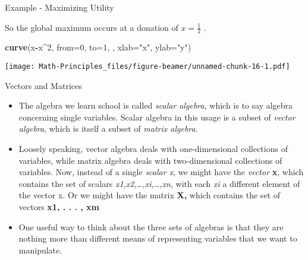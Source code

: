 \documentclass[
  ignorenonframetext,
]{beamer}
\newenvironment{Shaded}{\begin{snugshade}}{\end{snugshade}}
\newcommand{\DataTypeTok}[1]{\textcolor[rgb]{0.13,0.29,0.53}{#1}}
\newcommand{\DecValTok}[1]{\textcolor[rgb]{0.00,0.00,0.81}{#1}}
\newcommand{\KeywordTok}[1]{\textcolor[rgb]{0.13,0.29,0.53}{\textbf{#1}}}
\newcommand{\NormalTok}[1]{#1}
\newcommand{\OperatorTok}[1]{\textcolor[rgb]{0.81,0.36,0.00}{\textbf{#1}}}
\newcommand{\StringTok}[1]{\textcolor[rgb]{0.31,0.60,0.02}{#1}}
\begin{document}
\begin{frame}[fragile]{Example - Maximizing Utility}
\protect\hypertarget{example---maximizing-utility-1}{}

So the global maximum occurs at a donation of \(x=\frac{1}{2}\) .

\begin{Shaded}
\begin{Highlighting}[]
\KeywordTok{curve}\NormalTok{(x}\OperatorTok{-}\NormalTok{x}\OperatorTok{^}\DecValTok{2}\NormalTok{, }\DataTypeTok{from=}\DecValTok{0}\NormalTok{, }\DataTypeTok{to=}\DecValTok{1}\NormalTok{, , }\DataTypeTok{xlab=}\StringTok{"x"}\NormalTok{, }\DataTypeTok{ylab=}\StringTok{"y"}\NormalTok{)}
\end{Highlighting}
\end{Shaded}

\texttt{[image: Math-Principles\_files/figure-beamer/unnamed-chunk-16-1.pdf]}

\end{frame}

\begin{frame}{Vectors and Matrices}
\protect\hypertarget{vectors-and-matrices}{}

\begin{itemize}
\item
  The algebra we learn school is called \emph{scalar algebra}, which is
  to say algebra concerning single variables. Scalar algebra in this
  usage is a subset of \emph{vector algebra}, which is itself a subset
  of \emph{matrix algebra}.
\item
  Loosely speaking, vector algebra deals with one-dimensional
  collections of variables, while matrix algebra deals with
  two-dimensional collections of variables. Now, instead of a single
  \emph{scalar x}, we might have the \emph{vector} \textbf{x}, which
  contains the set of scalars \emph{x1,x2,\ldots,xi,\ldots,xn}, with
  each \emph{xi} a different element of the vector x. Or we might have
  the matrix \textbf{X,} which contains the set of vectors \textbf{x1, .
  . . , xm}
\item
  One useful way to think about the three sets of algebras is that they
  are nothing more than different means of representing variables that
  we want to manipulate.
\end{itemize}

\end{frame}
\end{document}
